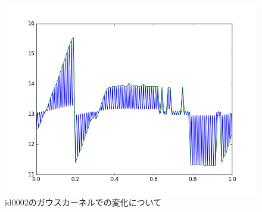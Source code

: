 \documentclass[]{jsarticle}
\begin{document}
\begin{figure}[htbp]
\begin{minipage}[b]{0.5\hsize}
  \includegraphics[scale=0.4]{./images/02gauss01p.png}
 \end{minipage}
 \caption{ id0002のガウスカーネルでの変化について}
\end{figure}
\end{document}
